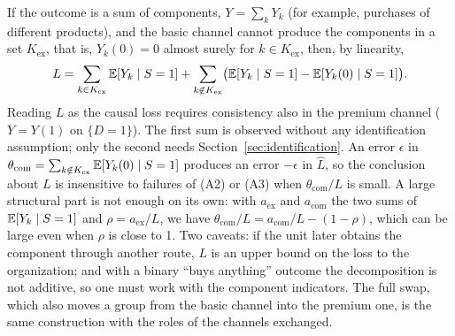 \begin{remark}\label{rem:decomposition}
If the outcome is a sum of components, $Y=\sum_kY_k$ (for example, purchases of different products), and the basic channel cannot produce the components in a set $K_{\mathrm{ex}}$, that is, $Y_k(0)=0$ almost surely for $k\in K_{\mathrm{ex}}$, then, by linearity,
\[
L=\sum_{k\in K_{\mathrm{ex}}}\mathbb{E}[Y_k\mid S=1]+\sum_{k\notin K_{\mathrm{ex}}}\bigl(\mathbb{E}[Y_k\mid S=1]-\mathbb{E}[Y_k(0)\mid S=1]\bigr).
\]
Reading $L$ as the causal loss requires consistency also in the premium channel ($Y=Y(1)$ on $\{D=1\}$). The first sum is observed without any identification assumption; only the second needs Section~\ref{sec:identification}. An error $\epsilon$ in $\theta_{\mathrm{com}}=\sum_{k\notin K_{\mathrm{ex}}}\mathbb{E}[Y_k(0)\mid S=1]$ produces an error $-\epsilon$ in $\hat L$, so the conclusion about $L$ is insensitive to failures of (A2) or (A3) when $\theta_{\mathrm{com}}/L$ is small. A large structural part is not enough on its own: with $a_{\mathrm{ex}}$ and $a_{\mathrm{com}}$ the two sums of $\mathbb{E}[Y_k\mid S=1]$ and $\rho=a_{\mathrm{ex}}/L$, we have $\theta_{\mathrm{com}}/L=a_{\mathrm{com}}/L-(1-\rho)$, which can be large even when $\rho$ is close to 1. Two caveats: if the unit later obtains the component through another route, $L$ is an upper bound on the loss to the organization; and with a binary ``buys anything'' outcome the decomposition is not additive, so one must work with the component indicators. The full swap, which also moves a group from the basic channel into the premium one, is the same construction with the roles of the channels exchanged.
\end{remark}
